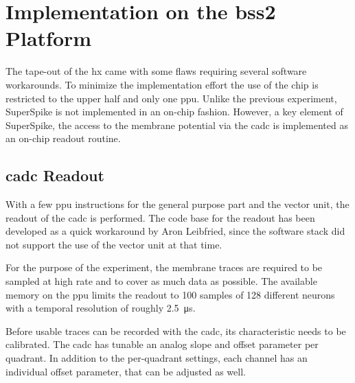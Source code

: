 \section{Implementation on the \acrshort{bss2} Platform}
The tape-out of the \gls{hx} came with some flaws requiring several software workarounds. To minimize the implementation effort the use of the chip is restricted to the upper half and only one \gls{ppu}. Unlike the previous experiment, SuperSpike is not implemented in an on-chip fashion. However, a key element of SuperSpike, the access to the membrane potential via the \gls{cadc} is implemented as an on-chip readout routine.

\subsection{\gls{cadc} Readout}
With a few \gls{ppu} instructions for the general purpose part and the vector unit, the readout of the \gls{cadc} is performed. The code base for the readout has been developed as a quick workaround by Aron Leibfried, since the software stack did not support the use of the vector unit at that time.

For the purpose of the experiment, the membrane traces are required to be sampled at high rate and to cover as much data as possible. The available memory on the \gls{ppu} limits the readout to 100 samples of 128 different neurons with a temporal resolution of roughly \SI{2.5}{\micro \s}. 

Before usable traces can be recorded with the \gls{cadc}, its characteristic needs to be calibrated. The \gls{cadc} has tunable an analog slope and offset parameter per quadrant. In addition to the per-quadrant settings, each channel has an individual offset parameter, that can be adjusted as well.

